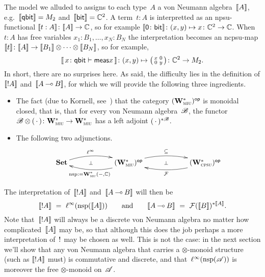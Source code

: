 \documentclass[a]{subfiles}
\begin{document}
\begin{parsec}
\begin{point}
The model
we alluded to
assigns to each type~$A$ a von Neumann algebra~$\llbracket A\rrbracket$,
e.g.~$\llbracket\mathsf{qbit}\rrbracket=M_2$
and~$\llbracket\mathsf{bit}\rrbracket=\mathbb{C}^2$.
A term~$t:A$
is interpretted as an npsu-functional $\llbracket t:A\rrbracket\colon \llbracket A\rrbracket\to\mathbb{C}$,
so for example $\llbracket\mathsf{0}\colon \mathsf{bit}\rrbracket\colon
(x,y)\mapsto x\colon \mathbb{C}^2\to\mathbb{C}$.
When~$t:A$ has free variables $x_1:B_1,\dotsc,x_N:B_N$
the interpretation 
becomes an ncpsu-map $\llbracket t\rrbracket\colon \llbracket A\rrbracket\to\llbracket B_1\rrbracket\otimes 
\dotsb \otimes \llbracket B_N\rrbracket$,
so for example,
\begin{equation*}
	\llbracket\, x\colon \mathsf{qbit} \vdash \mathsf{meas} x\,\rrbracket
\colon (x,y)\mapsto
\smash{\bigl(
	\begin{smallmatrix}x& 0 \\ 0 & y
	\end{smallmatrix}\bigr)}
\colon \mathbb{C}^2\to M_2.
\end{equation*}
In short, there are no surprises here.
As said, the difficulty lies
in the definition
of $\llbracket!A\rrbracket$ and~$\llbracket A\mathbin{\multimap} B\rrbracket$,
for which we will provide the following
three ingredients.
\begin{itemize}
\item
The fact (due to Kornell, see~)
that
the category 
${(\mathbf{W}^*_{\text{\textsc{miu}}})}{^{\mathsf{op}}}$
is monoidal closed,
that is,
that
for every von Neumann algebra~$\mathscr{B}$,
the functor
$\mathscr{B}\otimes (\,\cdot\,)\colon 
\mathbf{W}^*_{\text{\textsc{miu}}}\to \mathbf{W}^*_{\text{\textsc{miu}}}$
has a left adjoint
$(\,\cdot\,)^{*\mathscr{B}}$.

\item
The following two adjunctions.
\begin{equation*}
\xymatrix@C=6em{
	\Cat{Set}
	\ar@/^1.0em/[r]^-{\ell^\infty}
	\ar@{}[r]|-{\perp}
	&
	\op{(\W{miu})}
	\ar@/^1.0em/[r]^-{\subseteq}
	\ar@/^1.0em/[l]^-{\nsp:=\W{miu}(-,\C)}
	\ar@{}[r]|-{\perp}
	&
	\op{(\W{cpsu})}
	\ar@/^1.0em/[l]^-{\mathcal{F}}
}
\end{equation*}
\end{itemize}
\end{point}
The interpretation of~$\llbracket!A\rrbracket$
and~$\llbracket A\mathbin{\multimap} B\rrbracket$ will then be
\begin{equation*}
\sem{!A}\ =\ 
\linf(\nsp(\sem{A}))
\qquad\text{and}\qquad
\sem{A\limp B}
\ = \ 
\mathcal{F}(\sem{B})^{*\sem{A}}.
\end{equation*}
Note that~$\llbracket!A\rrbracket$
will always be a discrete von Neumann algebra
no matter how complicated~$\llbracket A\rrbracket$ may be,
so that although this does the job
perhaps a more interpretation of~$\mathord{!}$
may be chosen as well.
This is not the case:
in the next
section we'll show that
any von Neumann algebra
that carries 
a $\otimes$-monoid structure
(such as $\llbracket!A\rrbracket$ must)
is commutative and discrete,
and that~$\ell^\infty(\mathrm{nsp}(\mathscr{A}))$
is moreover the free $\otimes$-monoid
on~$\mathscr{A}$.
\end{parsec}
\end{document}
